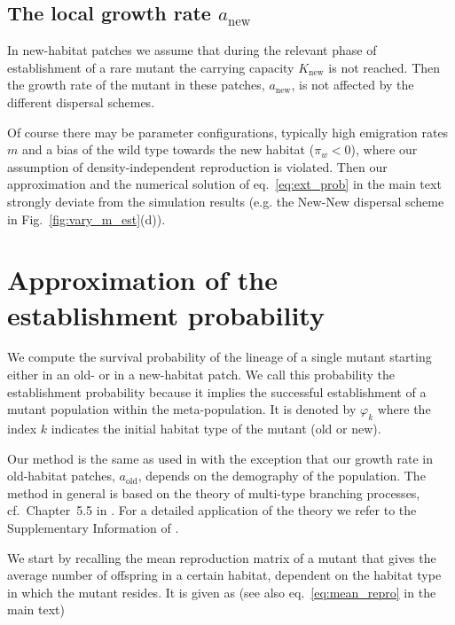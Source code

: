 \documentclass[11pt]{article}
\newcommand{\chg}[1]{\textcolor{change}{#1}}
\begin{document}
\subsection*{The local growth rate $a_{\text{new}}$}
\chg{In new-habitat patches we assume that during the relevant phase of establishment of a rare mutant the carrying capacity $K_{\text{new}}$ is not reached. Then the growth rate of the mutant in these patches, $a_{\text{new}}$, is not affected by the different dispersal schemes.} 

\chg{Of course there may be parameter configurations, typically high emigration rates $m$ and a bias of the wild type towards the new habitat ($\pi_w < 0$), where our assumption of density-independent reproduction is violated. Then our approximation and the numerical solution of eq.~\eqref{eq:ext_prob} in the main text strongly deviate from the simulation results (e.g. the New-New dispersal scheme in Fig.~\ref{fig:vary_m_est}(d)).}

\newpage
\renewcommand{\theequation}{B\arabic{equation}}
\setcounter{equation}{0}  %

\section{Approximation of the establishment probability}
We compute the survival probability \chg{of the lineage} of a single mutant starting either in an old- or in a new-habitat patch. We call this probability the establishment probability because it implies the successful establishment of a mutant population within the meta-population. It is denoted by $\varphi_k$ where the index $k$ indicates the initial habitat type of the mutant (old or new).

Our method is the same as used in \citet{tomasini_2018} with the exception that our growth rate in old-habitat patches, $a_{\text{old}}$, depends on the demography of the population. The method in general is based on the theory of multi-type branching processes, cf.~Chapter~5.5 in \citet{haccou_book}. For a detailed application of the theory we refer to the Supplementary Information of \citet{tomasini_2018}. 

We start by recalling the mean reproduction matrix of a mutant that gives the average number of offspring in a certain habitat, dependent on the habitat type in which the mutant resides. It is given as (see also eq.~\eqref{eq:mean_repro} in the main text)
\end{document}
